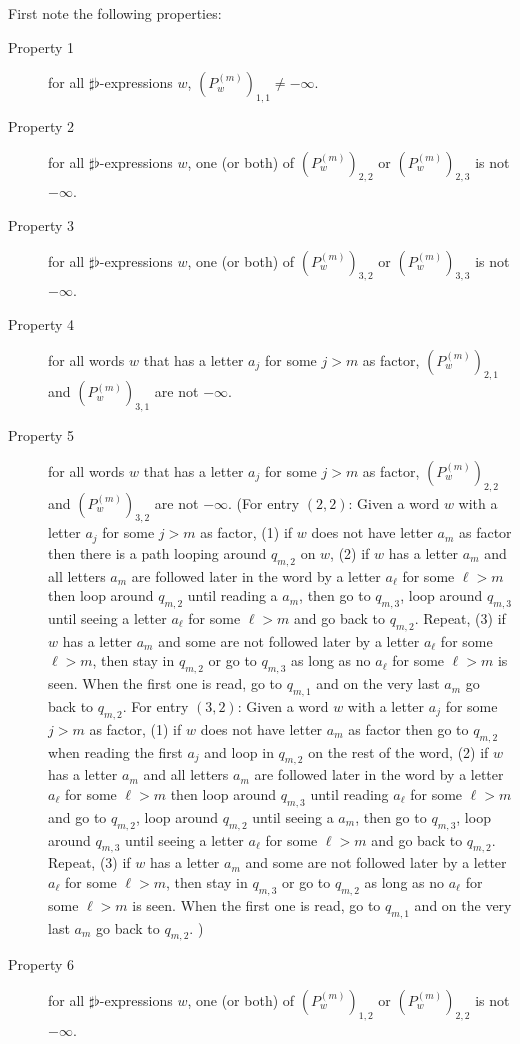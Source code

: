 \documentclass[10pt,a4paper]{amsart}
\theoremstyle{definition}
\numberwithin{equation}{section}
\theoremstyle{remark}
\theoremstyle{remark}
\begin{document}
First note the following properties:
\begin{description}
    
    \item[Property 1] for all $\sharp \flat$-expressions $w$, $(P^{(m)}_w)_{1,1} \neq -\infty$.
    \item[Property 2] for all $\sharp \flat$-expressions $w$, one (or both) of  $(P^{(m)}_w)_{2,2}$ or $(P^{(m)}_w)_{2,3}$ is not $-\infty$.
    \item[Property 3] for all $\sharp \flat$-expressions $w$, one (or both) of  $(P^{(m)}_w)_{3,2}$ or $(P^{(m)}_w)_{3,3}$ is not $-\infty$.
    \item[Property 4] for all words $w$ that has a letter $a_j$ for some $j>m$ as factor, $(P^{(m)}_w)_{2,1}$ and $(P^{(m)}_w)_{3,1}$ are not $-\infty$.
    \item[Property 5] for all words $w$ that has a letter $a_j$ for some $j>m$ as factor, $(P^{(m)}_w)_{2,2}$ and $(P^{(m)}_w)_{3,2}$ are not $-\infty$. (For entry $(2,2)$: Given a word $w$ with a letter $a_j$ for some $j>m$ as factor, (1) if $w$ does not have letter $a_m$ as factor then there is a path looping around $q_{m,2}$ on $w$, (2) if $w$ has a letter $a_m$ and all letters $a_m$ are followed later in the word by a letter $a_\ell$ for some $\ell > m$ then loop around $q_{m,2}$ until reading a $a_m$, then go to $q_{m,3}$, loop around $q_{m,3}$ until seeing a letter $a_\ell$ for some $\ell > m$ and go back to $q_{m,2}$. Repeat, (3) if $w$ has a letter $a_m$ and some are not followed later by a letter $a_\ell$ for some $\ell > m$, then stay in $q_{m,2}$ or go to $q_{m,3}$ as long as no $a_\ell$ for some $\ell > m$ is seen. When the first one is read, go to $q_{m,1}$ and on the very last $a_m$ go back to $q_{m,2}$.
    For entry $(3,2)$: Given a word $w$ with a letter $a_j$ for some $j>m$ as factor, (1) if $w$ does not have letter $a_m$ as factor then go to $q_{m,2}$ when reading the first $a_j$ and loop in $q_{m,2}$ on the rest of the word, (2) if $w$ has a letter $a_m$ and all letters $a_m$ are followed later in the word by a letter $a_\ell$ for some $\ell > m$ then loop around $q_{m,3}$ until reading $a_\ell$ for some $\ell > m$ and go to $q_{m,2}$, loop around $q_{m,2}$ until seeing a $a_m$, then go to $q_{m,3}$, loop around $q_{m,3}$ until seeing a letter $a_\ell$ for some $\ell > m$ and go back to $q_{m,2}$. Repeat, (3) if $w$ has a letter $a_m$ and some are not followed later by a letter $a_\ell$ for some $\ell > m$, then stay in $q_{m,3}$ or go to $q_{m,2}$ as long as no $a_\ell$ for some $\ell > m$ is seen. When the first one is read, go to $q_{m,1}$ and on the very last $a_m$ go back to $q_{m,2}$.
    ) 
    \item[Property 6] for all $\sharp \flat$-expressions $w$, one (or both) of  $(P^{(m)}_w)_{1,2}$ or $(P^{(m)}_w)_{2,2}$ is not $-\infty$.

\end{description}
\end{document}
